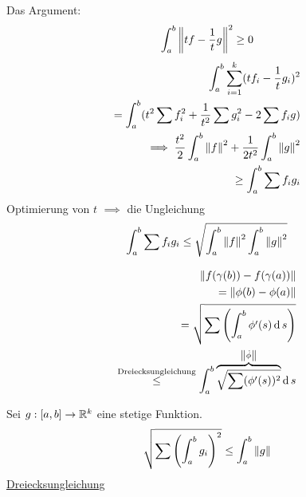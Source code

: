 \begin{Bew}
  Das Argument:
  \[\int_a^b\left\| tf-\frac{1}{t}g \right\|^2\geq 0\]
  \begin{eqnarray*}
    \int_a^b\sum_{i=1}^k(tf_i-\frac{1}{t}g_i)^2\\
    =\int_a^b(t^2\sum f_i^2+\frac{1}{t^2}\sum g_i^2-2\sum f_i g)\\
    \implies \frac{t^2}{2}\int_a^b\left\| f \right\|^2+\frac{1}{2t^2}\int_a^b\left\| g \right\|^2\\
    \geq \int_a^b\sum f_ig_i
  \end{eqnarray*}
  Optimierung von $t$ $\implies$ die Ungleichung
  \[\int_a^b\sum f_ig_i\leq\sqrt{\int_a^b\left\| f \right\|^2\int_a^b\left\| g \right\|^2}\]
\end{Bew}
\begin{eqnarray*}
  \left\| f(\gamma(b))-f(\gamma(a)) \right\|\\
  =\left\| \phi(b)-\phi(a) \right\|\\
  =\sqrt{\sum\left( \int_a^b\phi'(s)\operatorname{d} s \right)}\\
  \stackrel{\text{Dreiecksungleichung}}{\leq}\int_a^b\overbrace{\sqrt{\sum(\phi'(s))^2}}^{\left\| \dot\phi \right\|}\operatorname{d} s\\
\end{eqnarray*}
\begin{Lem}
  Sei $g:[a,b]\rightarrow\mathbb{R}^k$ eine stetige Funktion.
  \[\sqrt{\sum\left( \int_a^bg_i \right)^2}\leq\int_a^b\left\| g \right\|\]
  \ul{Dreiecksungleichung}
\end{Lem}
